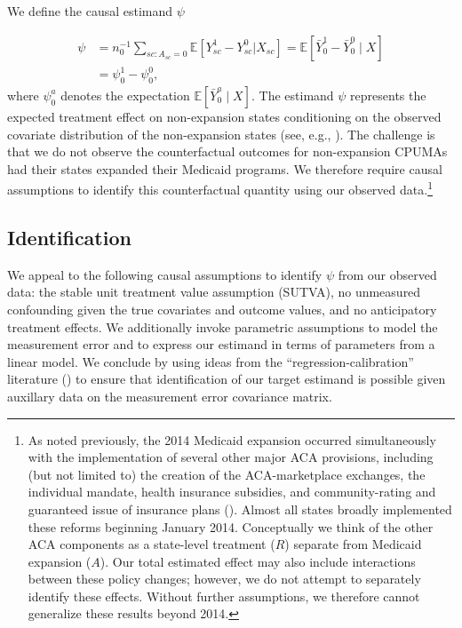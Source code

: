 \documentclass[aoas]{imsart}
\theoremstyle{plain}
\theoremstyle{remark}
\begin{document}
We define the causal estimand $\psi$

\begin{align} \label{eqn:psi}
    \psi &= n_0^{-1} \sum_{sc: A_{sc}=0} \mathbb{E}\left[ Y_{sc}^1 - Y_{sc}^0 | X_{sc}\right] = \mathbb{E}[\bar{Y}_0^1 - \bar{Y}_0^0 \mid X] \\ 
    &= \psi_0^1 - \psi_0^0,
\end{align}
where $\psi_0^a$ denotes the expectation $\mathbb{E}[\bar{Y}_0^a \mid X]$. The estimand $\psi$ represents the expected treatment effect on non-expansion states conditioning on the observed covariate distribution of the non-expansion states (see, e.g., \cite{imbens2004nonparametric}). The challenge is that we do not observe the counterfactual outcomes for non-expansion CPUMAs had their states expanded their Medicaid programs. We therefore require causal assumptions to identify this counterfactual quantity using our observed data.\footnote{As noted previously, the 2014 Medicaid expansion occurred simultaneously with the implementation of several other major ACA provisions, including (but not limited to) the creation of the ACA-marketplace exchanges, the individual mandate, health insurance subsidies, and community-rating and guaranteed issue of insurance plans (\cite{courtemanche2017early}). Almost all states broadly implemented these reforms beginning January 2014. Conceptually we think of the other ACA components as a state-level treatment ($R$) separate from Medicaid expansion ($A$). Our total estimated effect may also include interactions between these policy changes; however, we do not attempt to separately identify these effects. Without further assumptions, we therefore cannot generalize these results beyond 2014.} 

\subsection{Identification} \label{ssec:identification}

We appeal to the following causal assumptions to identify $\psi$ from our observed data: the stable unit treatment value assumption (SUTVA), no unmeasured confounding given the true covariates and outcome values, and no anticipatory treatment effects. We additionally invoke parametric assumptions to model the measurement error and to express our estimand in terms of parameters from a linear model. We conclude by using ideas from the ``regression-calibration'' literature (\cite{gleser1992importance}) to ensure that identification of our target estimand is possible given auxillary data on the measurement error covariance matrix.
\end{document}
